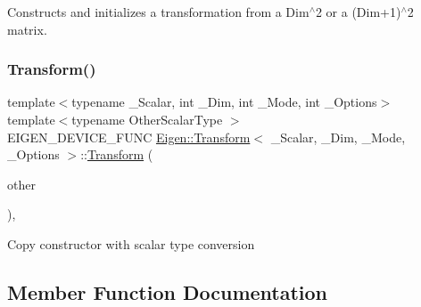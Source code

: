 Constructs and initializes a transformation from a Dim$^\wedge$2 or a (Dim+1)$^\wedge$2 matrix. \mbox{\label{class_eigen_1_1_transform_a2a6f70385c79d72564e9b309f636ce1d}} 
\subsubsection{\texorpdfstring{Transform()}{Transform()}\hspace{0.1cm}{\footnotesize\ttfamily [3/3]}}
{\footnotesize\ttfamily template$<$typename \+\_\+\+Scalar, int \+\_\+\+Dim, int \+\_\+\+Mode, int \+\_\+\+Options$>$ \\
template$<$typename Other\+Scalar\+Type $>$ \\
E\+I\+G\+E\+N\+\_\+\+D\+E\+V\+I\+C\+E\+\_\+\+F\+U\+NC \mbox{\hyperlink{class_eigen_1_1_transform}{Eigen\+::\+Transform}}$<$ \+\_\+\+Scalar, \+\_\+\+Dim, \+\_\+\+Mode, \+\_\+\+Options $>$\+::\mbox{\hyperlink{class_eigen_1_1_transform}{Transform}} (\begin{DoxyParamCaption}\item[{const \mbox{\hyperlink{class_eigen_1_1_transform}{Transform}}$<$ Other\+Scalar\+Type, Dim, \mbox{\hyperlink{struct_mode}{Mode}}, Options $>$ \&}]{other }\end{DoxyParamCaption})\hspace{0.3cm}{\ttfamily [inline]}, {\ttfamily [explicit]}}

Copy constructor with scalar type conversion 

\subsection{Member Function Documentation}
\mbox{\label{class_eigen_1_1_transform_a88c996ca4cccf46ab4d520b7d99c332b}} 
